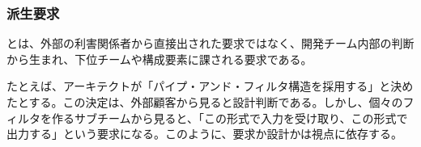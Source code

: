 \subsubsection{派生要求}

とは、外部の利害関係者から直接出された要求ではなく、開発チーム内部の判断から生まれ、下位チームや構成要素に課される要求である。

たとえば、アーキテクトが「パイプ・アンド・フィルタ構造を採用する」と決めたとする。この決定は、外部顧客から見ると設計判断である。しかし、個々のフィルタを作るサブチームから見ると、「この形式で入力を受け取り、この形式で出力する」という要求になる。このように、要求か設計かは視点に依存する。

